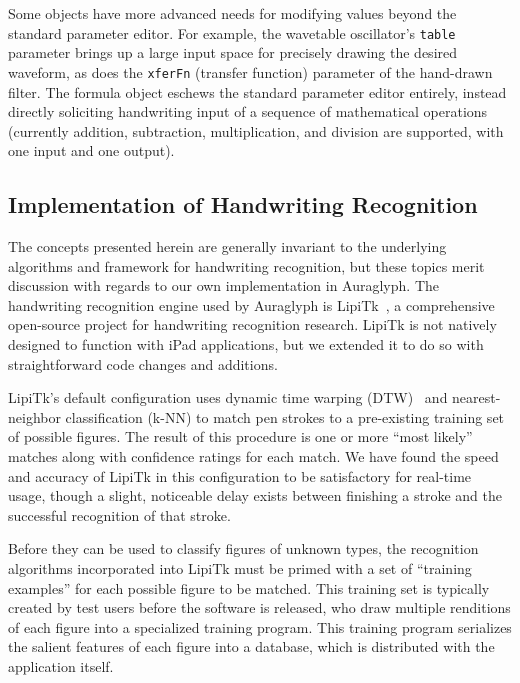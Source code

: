 \documentclass{nime-alternate}
\begin{document}
Some objects have more advanced needs for modifying values beyond the standard parameter editor.  
For example, the wavetable oscillator's \texttt{table} parameter brings up a large input space for precisely drawing the desired waveform, as does the \texttt{xferFn} (transfer function) parameter of the hand-drawn filter. 
The formula object eschews the standard parameter editor entirely, instead directly soliciting handwriting input of a sequence of mathematical operations (currently addition, subtraction, multiplication, and division are supported, with one input and one output). 

\subsection{Implementation of Handwriting Recognition}
\label{sec:HandwritingRecognition}

The concepts presented herein are generally invariant to the underlying algorithms and framework for handwriting recognition, but these topics merit discussion with regards to our own implementation in Auraglyph. 
The handwriting recognition engine used by Auraglyph is LipiTk~\cite{madhvanath2007lipitk}, a comprehensive open-source project for handwriting recognition research. 
LipiTk is not natively designed to function with iPad applications, but we extended it to do so with straightforward code changes and additions. 

LipiTk's default configuration uses dynamic time warping (DTW)~\cite{niels2005using} and nearest-neighbor classification (k-NN) to match pen strokes to a pre-existing training set of possible figures. 
The result of this procedure is one or more ``most likely'' matches along with confidence ratings for each match. 
We have found the speed and accuracy of LipiTk in this configuration to be satisfactory for real-time usage, though a slight, noticeable delay exists between finishing a stroke and the successful recognition of that stroke. 

Before they can be used to classify figures of unknown types, the recognition algorithms incorporated into LipiTk must be primed with a set of ``training examples'' for each possible figure to be matched. 
This training set is typically created by test users before the software is released, who draw multiple renditions of each figure into a specialized training program. 
This training program serializes the salient features of each figure into a database, which is distributed with the application itself. 
\end{document}
